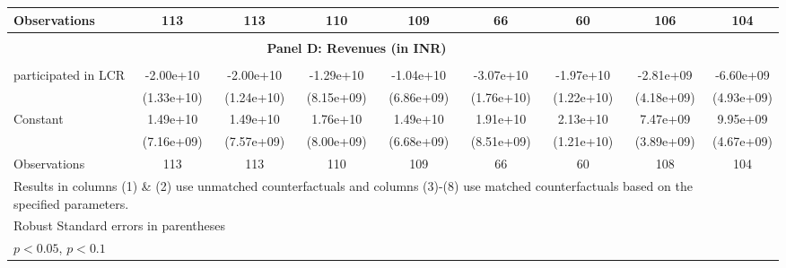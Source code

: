 \begin{table}[htbp]
\begin{tabular}{l*{8}{c}}
Observations        &         113         &         113         &         110         &         109         &          66         &          60         &         106         &         104         \\
\hline \\ \multicolumn{8}{c}{\textbf{Panel D: Revenues (in INR)}} \\\\[-1ex]
participated in LCR &   -2.00e+10         &   -2.00e+10         &   -1.29e+10         &   -1.04e+10         &   -3.07e+10\sym{*}  &   -1.97e+10         &   -2.81e+09         &   -6.60e+09         \\
                    &  (1.33e+10)         &  (1.24e+10)         &  (8.15e+09)         &  (6.86e+09)         &  (1.76e+10)         &  (1.22e+10)         &  (4.18e+09)         &  (4.93e+09)         \\
[1em]
Constant            &    1.49e+10\sym{**} &    1.49e+10\sym{*}  &    1.76e+10\sym{**} &    1.49e+10\sym{**} &    1.91e+10\sym{**} &    2.13e+10\sym{*}  &    7.47e+09\sym{*}  &    9.95e+09\sym{**} \\
                    &  (7.16e+09)         &  (7.57e+09)         &  (8.00e+09)         &  (6.68e+09)         &  (8.51e+09)         &  (1.21e+10)         &  (3.89e+09)         &  (4.67e+09)         \\
\hline
Observations        &         113         &         113         &         110         &         109         &          66         &          60         &         108         &         104         \\
\hline\hline\hline \multicolumn{8}{l}{\footnotesize Results in columns (1) \& (2) use unmatched counterfactuals and columns (3)-(8) use matched counterfactuals based on the specified parameters. }\\\multicolumn{5}{l}{\footnotesize Robust Standard errors in parentheses}\\\multicolumn{2}{l}{\footnotesize \sym{**} \(p<0.05\), \sym{*} \(p<0.1\)}\\ \end{tabular} \\ \end{table}

